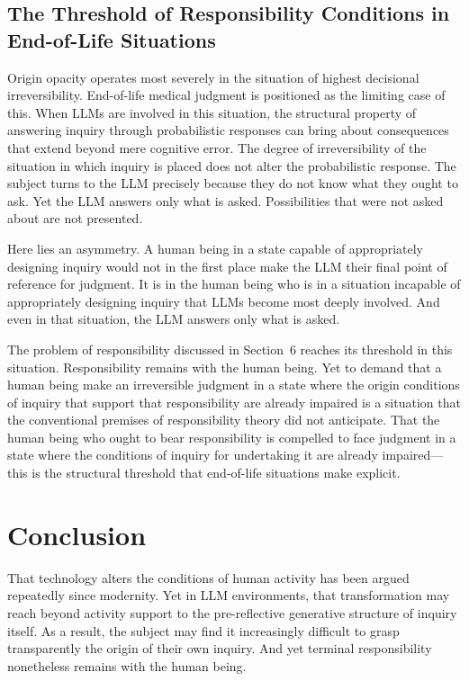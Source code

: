 \documentclass[12pt]{article}
\begin{document}
\subsection{The Threshold of Responsibility Conditions in End-of-Life Situations}

Origin opacity operates most severely in the situation of highest decisional irreversibility. End-of-life medical judgment is positioned as the limiting case of this. When LLMs are involved in this situation, the structural property of answering inquiry through probabilistic responses can bring about consequences that extend beyond mere cognitive error. The degree of irreversibility of the situation in which inquiry is placed does not alter the probabilistic response. The subject turns to the LLM precisely because they do not know what they ought to ask. Yet the LLM answers only what is asked. Possibilities that were not asked about are not presented.

Here lies an asymmetry. A human being in a state capable of appropriately designing inquiry would not in the first place make the LLM their final point of reference for judgment. It is in the human being who is in a situation incapable of appropriately designing inquiry that LLMs become most deeply involved. And even in that situation, the LLM answers only what is asked.

The problem of responsibility discussed in Section~6 reaches its threshold in this situation. Responsibility remains with the human being. Yet to demand that a human being make an irreversible judgment in a state where the origin conditions of inquiry that support that responsibility are already impaired is a situation that the conventional premises of responsibility theory did not anticipate. That the human being who ought to bear responsibility is compelled to face judgment in a state where the conditions of inquiry for undertaking it are already impaired---this is the structural threshold that end-of-life situations make explicit.

\section{Conclusion}

That technology alters the conditions of human activity has been argued repeatedly since modernity. Yet in LLM environments, that transformation may reach beyond activity support to the pre-reflective generative structure of inquiry itself. As a result, the subject may find it increasingly difficult to grasp transparently the origin of their own inquiry. And yet terminal responsibility nonetheless remains with the human being.
\end{document}
